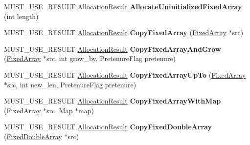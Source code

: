 \begin{DoxyCompactItemize}
\item 
M\+U\+S\+T\+\_\+\+U\+S\+E\+\_\+\+R\+E\+S\+U\+LT \hyperlink{classv8_1_1internal_1_1_allocation_result}{Allocation\+Result} {\bfseries Allocate\+Uninitialized\+Fixed\+Array} (int length)\hypertarget{classv8_1_1internal_1_1_heap_a4191f45cc678f2fb482d6408bb6d2451}{}\label{classv8_1_1internal_1_1_heap_a4191f45cc678f2fb482d6408bb6d2451}

\item 
M\+U\+S\+T\+\_\+\+U\+S\+E\+\_\+\+R\+E\+S\+U\+LT \hyperlink{classv8_1_1internal_1_1_allocation_result}{Allocation\+Result} {\bfseries Copy\+Fixed\+Array} (\hyperlink{classv8_1_1internal_1_1_fixed_array}{Fixed\+Array} $\ast$src)\hypertarget{classv8_1_1internal_1_1_heap_a0146a542eaaa9b7b2fa1fe90de392064}{}\label{classv8_1_1internal_1_1_heap_a0146a542eaaa9b7b2fa1fe90de392064}

\item 
M\+U\+S\+T\+\_\+\+U\+S\+E\+\_\+\+R\+E\+S\+U\+LT \hyperlink{classv8_1_1internal_1_1_allocation_result}{Allocation\+Result} {\bfseries Copy\+Fixed\+Array\+And\+Grow} (\hyperlink{classv8_1_1internal_1_1_fixed_array}{Fixed\+Array} $\ast$src, int grow\+\_\+by, Pretenure\+Flag pretenure)\hypertarget{classv8_1_1internal_1_1_heap_a83a703d42f055ce4d5191813ca2c3370}{}\label{classv8_1_1internal_1_1_heap_a83a703d42f055ce4d5191813ca2c3370}

\item 
M\+U\+S\+T\+\_\+\+U\+S\+E\+\_\+\+R\+E\+S\+U\+LT \hyperlink{classv8_1_1internal_1_1_allocation_result}{Allocation\+Result} {\bfseries Copy\+Fixed\+Array\+Up\+To} (\hyperlink{classv8_1_1internal_1_1_fixed_array}{Fixed\+Array} $\ast$src, int new\+\_\+len, Pretenure\+Flag pretenure)\hypertarget{classv8_1_1internal_1_1_heap_a1dc3107bbe790bd5d958361ae383810e}{}\label{classv8_1_1internal_1_1_heap_a1dc3107bbe790bd5d958361ae383810e}

\item 
M\+U\+S\+T\+\_\+\+U\+S\+E\+\_\+\+R\+E\+S\+U\+LT \hyperlink{classv8_1_1internal_1_1_allocation_result}{Allocation\+Result} {\bfseries Copy\+Fixed\+Array\+With\+Map} (\hyperlink{classv8_1_1internal_1_1_fixed_array}{Fixed\+Array} $\ast$src, \hyperlink{classv8_1_1internal_1_1_map}{Map} $\ast$map)\hypertarget{classv8_1_1internal_1_1_heap_a38b2fb0951b6cad4d66db7a9ad2f69e3}{}\label{classv8_1_1internal_1_1_heap_a38b2fb0951b6cad4d66db7a9ad2f69e3}

\item 
M\+U\+S\+T\+\_\+\+U\+S\+E\+\_\+\+R\+E\+S\+U\+LT \hyperlink{classv8_1_1internal_1_1_allocation_result}{Allocation\+Result} {\bfseries Copy\+Fixed\+Double\+Array} (\hyperlink{classv8_1_1internal_1_1_fixed_double_array}{Fixed\+Double\+Array} $\ast$src)\hypertarget{classv8_1_1internal_1_1_heap_a8371d545e024ce861e247bfeab4254c8}{}\label{classv8_1_1internal_1_1_heap_a8371d545e024ce861e247bfeab4254c8}


\end{DoxyCompactItemize}
